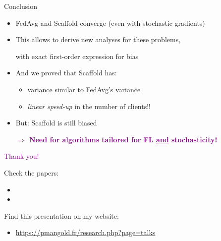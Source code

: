 \documentclass[aspectratio=169,12pt]{beamer}
\begin{document}
\begin{frame}{Conclusion}

  \begin{itemize}[itemsep=1em]
  \item FedAvg and Scaffold converge (even with stochastic gradients)
  \item This allows to derive new analyses for these problems,

    with exact first-order expression for bias
  \item And we proved that Scaffold has:
    \begin{itemize}
    \item variance similar to FedAvg's variance
    \item \textit{linear speed-up} in the number of clients!!
    \end{itemize}

  \item But: Scaffold is still biased
    
  \textbf{\textcolor{purple}{$\Rightarrow$ Need for algorithms tailored for FL \underline{and} stochasticity!}}
    
  \end{itemize}


\end{frame}



\begin{frame}
  \begin{center}
    \huge \textcolor{purple}{
      Thank you!
      }
    \end{center}

    Check the papers:
    \vspace{-1em}
    \begin{itemize}
    \item \small {}
    \item \small {}
    \end{itemize}

    Find this presentation on my website:
    \vspace{-1em}
    \begin{itemize}
    \item \textcolor{amaranth}{\url{https://pmangold.fr/research.php?page=talks}}
    \end{itemize}
    
\end{frame}
\end{document}
